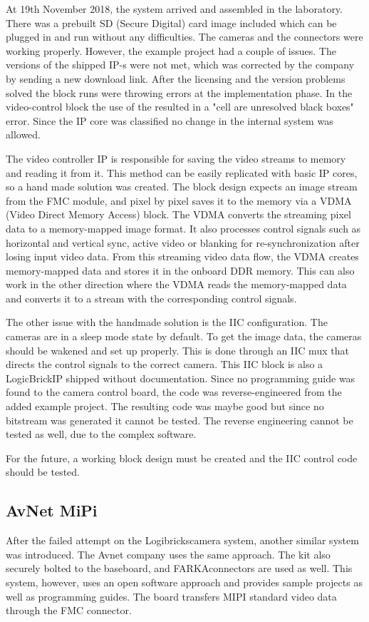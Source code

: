 At 19th November 2018, the system arrived and assembled in the laboratory.
There was a prebuilt SD (Secure Digital) card image included which can be plugged in and run without any difficulties.
The cameras and the connectors were working properly.
However, the example project had a couple of issues.
The versions of the shipped IP-s were not met, which was corrected by the company by sending a new download link.
After the licensing and the version problems solved the block runs were throwing errors at the implementation phase.
In the video-control block the use of the  resulted in a "cell are unresolved black boxes" error.
Since the IP core was classified no change in the internal system was allowed.

The video controller IP is responsible for saving the video streams to memory and reading it from it.
This method can be easily replicated with basic IP cores, so a hand made solution was created.
The block design expects an image stream from the FMC module, and pixel by pixel saves it to the memory via a VDMA (Video Direct Memory Access) block.
The VDMA converts the streaming pixel data to a memory-mapped image format.
It also processes control signals such as horizontal and vertical sync, active video or blanking for re-synchronization after losing input video data.
From this streaming video data flow, the VDMA creates memory-mapped data and stores it in the onboard DDR memory.
This can also work in the other direction where the VDMA reads the memory-mapped data and converts it to a stream with the corresponding control signals.

The other issue with the handmade solution is the IIC configuration.
The cameras are in a sleep mode state by default.
To get the image data, the cameras should be wakened and set up properly.
This is done through an IIC mux that directs the control signals to the correct camera.
This IIC block is also a LogicBrick\texttrademark IP shipped without documentation.
Since no programming guide was found to the camera control board, the code was reverse-engineered from the added example project.
The resulting code was maybe good but since no bitstream was generated it cannot be tested.
The reverse engineering cannot be tested as well, due to the complex software.

For the future, a working block design must be created and the IIC control code should be tested.

\subsection{AvNet MiPi} %
After the failed attempt on the Logibricks\texttrademark camera system, another similar system was introduced. 
The Avnet\texttrademark \cite{avnet_HUG} company uses the same approach.
The kit also securely bolted to the baseboard, and FARKA\texttrademark connectors are used as well.
This system, however, uses an open software approach and provides sample projects as well as programming guides.
The board transfers MIPI standard video data through the FMC connector.

